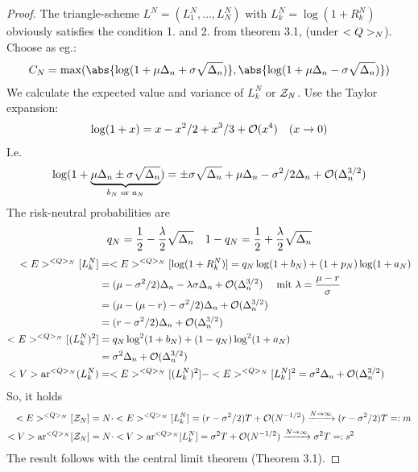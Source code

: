 \begin{proof}
	The triangle-scheme $L^N = (L^N_1, \dots, L_N^N)$ with $L^N_k = \log(1+R^N_k)$ obviously satisfies the condition 1. and 2. from theorem 3.1, (under $<Q>_N$). %
	Choose as eg.: 
	\begin{align*}
		C_N = \max(\abs{\log(1+\mu\Delta_n + \sigma\sqrt{\Delta_n})}, \abs{\log(1+\mu \Delta_n - \sigma\sqrt{\Delta_n})})
	\end{align*}
	We calculate the expected value and variance of $L^N_k$ or $\mathcal{Z}_N$. Use the Taylor expansion:
	\begin{align*}
		\log(1+x) = x - x^2/2 + x^3/3 + \mathcal{O}(x^4) \quad (x \to 0)
	\end{align*}
	I.e.
	\begin{align*}
		\log(1+ \underbrace{\mu \Delta_n \pm \sigma\sqrt{\Delta_n}}_{b_N \text{ or }a_N}) = \pm \sigma \sqrt{\Delta_n} + \mu \Delta_n - \sigma^2/2 \Delta_n + \mathcal{O}(\Delta_n^{3/2})
	\end{align*}
	The risk-neutral probabilities are
	\begin{align*}
		q_N = \frac{1}{2} - \frac{\lambda}{2}\sqrt{\Delta_n}\quad 1-q_N = \frac{1}{2} + \frac{\lambda}{2}\sqrt{\Delta_n}
	\end{align*}
	\begin{align*}
		<E>^{<Q>_N}[L^N_k] &= <E>^{<Q>_N}[\log(1+R^N_k)] = q_N\log(1+b_N) + (1+p_N)\log(1+a_N)\\
		&= (\mu - \sigma^2/2)\Delta_n - \lambda\sigma\Delta_n + \mathcal{O}(\Delta_n^{3/2}) \quad \text{ mit } \lambda = \frac{\mu -r}{\sigma}\\
		&= (\mu - (\mu - r) - \sigma^2/2) \Delta_n + \mathcal{O}(\Delta_n^{3/2})\\
		&= (r-\sigma^2/2)\Delta_n + \mathcal{O}(\Delta_n^{3/2})\\
		<E>^{<Q>_N}[(L^N_k)^2] &= q_N\log^2(1+b_N) + (1-q_N)\log^2(1+a_N)\\
		&= \sigma^2\Delta_n + \mathcal{O}(\Delta_n^{3/2})\\
		<V>\text{ar}^{<Q>_N}(L^N_k) &= <E>^{<Q>_N}[(L^N_k)^2]-<E>^{<Q>_N}[L^N_k]^2 = \sigma^2\Delta_n + \mathcal{O}(\Delta_n^{3/2})
	\end{align*}
	So, it holds
	\begin{align*}
		<E>^{<Q>_N}[\mathcal{Z}_N] &= N \cdot <E>^{<Q>_N}[L_k^N] = (r-\sigma^2/2)T + \mathcal{O}(N^{-1/2}) \xrightarrow{N \to \infty} (r-\sigma^2/2)T =: m\\
		<V>\text{ar}^{<Q>_N}[\mathcal{Z}_N] &= N \cdot <V>\text{ar}^{<Q>_N}[L^N_k] = \sigma^2 T + \mathcal{O}(N^{-1/2}) \xrightarrow{N \to \infty} \sigma^2T =:s^2
	\end{align*}
	The result follows with the central limit theorem (Theorem 3.1).
\end{proof}
